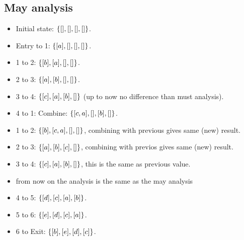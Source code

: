 \documentclass[a4paper]{article}
\begin{document}
\subsection{May analysis}

\begin{itemize}
  \item Initial state: $ \{ [], [], [], [] \} $.
  \item Entry to 1: $ \{ [a], [], [], [] \} $.
  \item 1 to 2: $ \{ [b], [a], [], [] \} $.
  \item 2 to 3: $ \{ [a], [b], [], [] \} $.
  \item 3 to 4: $ \{ [c], [a], [b], [] \} $ (up to now no difference than must analysis).
  \item 4 to 1: Combine: $ \{ [c, a], [], [b], [] \} $.
  \item 1 to 2: $ \{ [b], [c, a], [], [] \} $, combining with previous gives same (new) result.
  \item 2 to 3: $ \{ [a], [b], [c], [] \} $, combining with previos gives same (new) result.
  \item 3 to 4: $ \{ [c], [a], [b], [] \} $, this is the same as previous value.
  \item from now on the analysis is the same as the may analysis
  \item 4 to 5: $ \{ [d], [c], [a], [b] \} $.
  \item 5 to 6: $ \{ [e], [d], [c], [a] \} $.
  \item 6 to Exit: $ \{ [b], [e], [d], [c] \} $.
\end{itemize}
\end{document}
